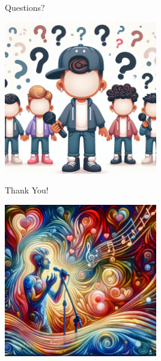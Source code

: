 \documentclass{beamer}
\begin{document}
\begin{frame}{Questions?}
    \begin{center}
        \includegraphics[width=0.5\textwidth]{./images/Questions.png}
    \end{center}
\end{frame}

\begin{frame}{Thank You!}
    \begin{center}
        \includegraphics[width=0.5\textwidth]{./images/ThankYou.png}
    \end{center}
\end{frame}
\end{document}
